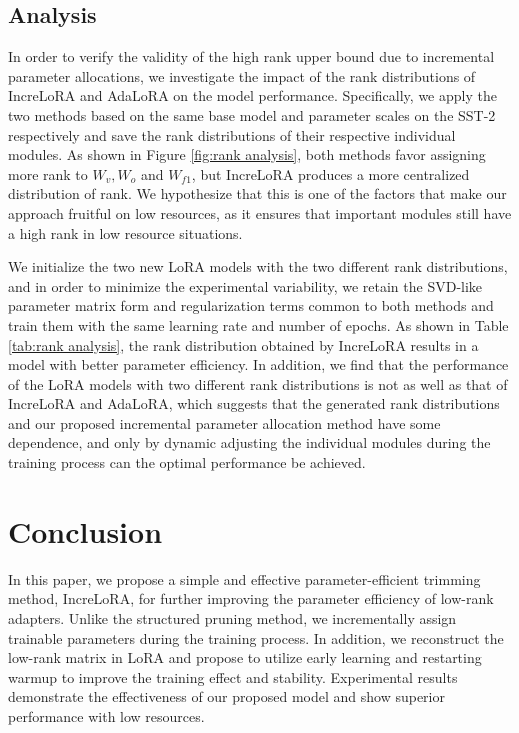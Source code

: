 \subsection{Analysis}
In order to verify the validity of the high rank upper bound due to incremental parameter allocations, we investigate the impact of the rank distributions of IncreLoRA and AdaLoRA on the model performance. Specifically, we apply the two methods based on the same base model and parameter scales on the SST-2 respectively and save the rank distributions of their respective individual modules. As shown in Figure \ref{fig:rank analysis}, both methods favor assigning more rank to $W_v,W_o$ and $W_{f1}$, but IncreLoRA produces a more centralized distribution of rank. We hypothesize that this is one of the factors that make our approach fruitful on low resources,  as it ensures that important modules still have a high rank in low resource situations.

We initialize the two new LoRA models with the two different rank distributions, and in order to minimize the experimental variability, we retain the SVD-like parameter matrix form and regularization terms common to both methods and train them with the same learning rate and number of epochs. As shown in Table \ref{tab:rank analysis}, the rank distribution obtained by IncreLoRA results in a model with better parameter efficiency. In addition, we find that the performance of the LoRA models with two different rank distributions is not as well as that of IncreLoRA and AdaLoRA, which suggests that the generated rank distributions and our proposed incremental parameter allocation method have some dependence, and only by dynamic adjusting the individual modules during the training process can the optimal performance be achieved.

\section{Conclusion}
In this paper, we propose a simple and effective parameter-efficient trimming method, IncreLoRA, for further improving the parameter efficiency of low-rank adapters. Unlike the structured pruning method, we incrementally assign trainable parameters during the training process. In addition, we reconstruct the low-rank matrix in LoRA and propose to utilize early learning and restarting warmup to improve the training effect and stability. Experimental results demonstrate the effectiveness of our proposed model and show superior performance with low resources.


